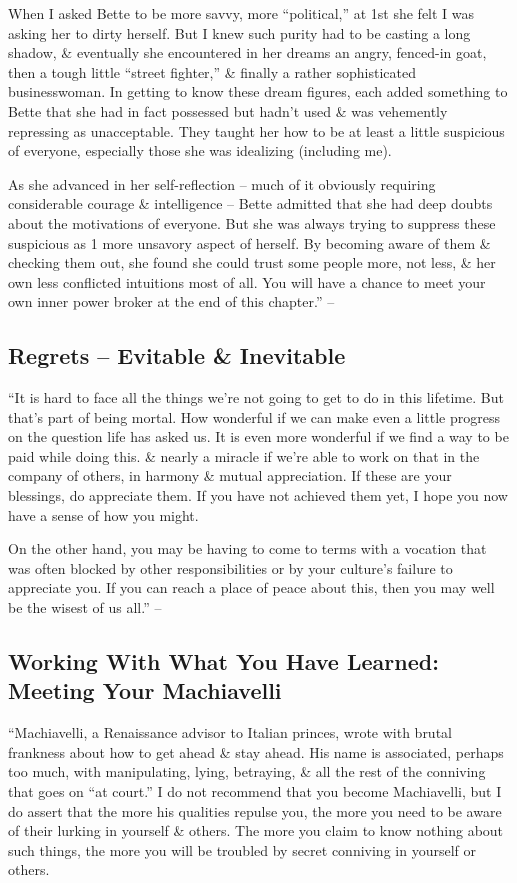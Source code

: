 \documentclass{article}
\numberwithin{equation}{section}
\begin{document}
When I asked Bette to be more savvy, more ``political,'' at 1st she felt I was asking her to dirty herself. But I knew such purity had to be casting a long shadow, \& eventually she encountered in her dreams an angry, fenced-in goat, then a tough little ``street fighter,'' \& finally a rather sophisticated businesswoman. In getting to know these dream figures, each added something to Bette that she had in fact possessed but hadn't used \& was vehemently repressing as unacceptable. They taught her how to be at least a little suspicious of everyone, especially those she was idealizing (including me).

As she advanced in her self-reflection -- much of it obviously requiring considerable courage \& intelligence -- Bette admitted that she had deep doubts about the motivations of everyone. But she was always trying to suppress these suspicious as 1 more unsavory aspect of herself. By becoming aware of them \& checking them out, she found she could trust some people more, not less, \& her own less conflicted intuitions most of all. You will have a chance to meet your own inner power broker at the end of this chapter.'' -- \cite[pp. 165--167]{Aron2013}

\subsection{Regrets -- Evitable \& Inevitable}
``It is hard to face all the things we're not going to get to do in this lifetime. But that's part of being mortal. How wonderful if we can make even a little progress on the question life has asked us. It is even more wonderful if we find a way to be paid while doing this. \& nearly a miracle if we're able to work on that in the company of others, in harmony \& mutual appreciation. If these are your blessings, do appreciate them. If you have not achieved them yet, I hope you now have a sense of how you might.

On the other hand, you may be having to come to terms with a vocation that was often blocked by other responsibilities or by your culture's failure to appreciate you. If you can reach a place of peace about this, then you may well be the wisest of us all.'' -- \cite[pp. 167--168]{Aron2013}

\subsection{Working With What You Have Learned: Meeting Your Machiavelli}
``Machiavelli, a Renaissance advisor to Italian princes, wrote with brutal frankness about how to get ahead \& stay ahead. His name is associated, perhaps too much, with manipulating, lying, betraying, \& all the rest of the conniving that goes on ``at court.'' I do not recommend that you become Machiavelli, but I do assert that the more his qualities repulse you, the more you need to be aware of their lurking in yourself \& others. The more you claim to know nothing about such things, the more you will be troubled by secret conniving in yourself or others.
\end{document}
